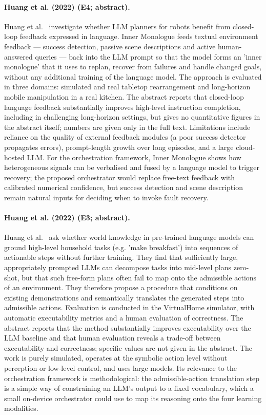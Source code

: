 \documentclass[10pt,a4paper]{article}
\begin{document}
\paragraph{Huang et al. (2022) (E4; abstract).} Huang et al.~\cite{Huang2022b} investigate whether LLM planners for robots benefit from closed-loop feedback expressed in language. Inner Monologue feeds textual environment feedback --- success detection, passive scene descriptions and active human-answered queries --- back into the LLM prompt so that the model forms an 'inner monologue' that it uses to replan, recover from failures and handle changed goals, without any additional training of the language model. The approach is evaluated in three domains: simulated and real tabletop rearrangement and long-horizon mobile manipulation in a real kitchen. The abstract reports that closed-loop language feedback substantially improves high-level instruction completion, including in challenging long-horizon settings, but gives no quantitative figures in the abstract itself; numbers are given only in the full text. Limitations include reliance on the quality of external feedback modules (a poor success detector propagates errors), prompt-length growth over long episodes, and a large cloud-hosted LLM. For the orchestration framework, Inner Monologue shows how heterogeneous signals can be verbalised and fused by a language model to trigger recovery; the proposed orchestrator would replace free-text feedback with calibrated numerical confidence, but success detection and scene description remain natural inputs for deciding when to invoke fault recovery.

\paragraph{Huang et al. (2022) (E3; abstract).} Huang et al.~\cite{Huang2022a} ask whether world knowledge in pre-trained language models can ground high-level household tasks (e.g. 'make breakfast') into sequences of actionable steps without further training. They find that sufficiently large, appropriately prompted LLMs can decompose tasks into mid-level plans zero-shot, but that such free-form plans often fail to map onto the admissible actions of an environment. They therefore propose a procedure that conditions on existing demonstrations and semantically translates the generated steps into admissible actions. Evaluation is conducted in the VirtualHome simulator, with automatic executability metrics and a human evaluation of correctness. The abstract reports that the method substantially improves executability over the LLM baseline and that human evaluation reveals a trade-off between executability and correctness; specific values are not given in the abstract. The work is purely simulated, operates at the symbolic action level without perception or low-level control, and uses large models. Its relevance to the orchestration framework is methodological: the admissible-action translation step is a simple way of constraining an LLM's output to a fixed vocabulary, which a small on-device orchestrator could use to map its reasoning onto the four learning modalities.
\end{document}
